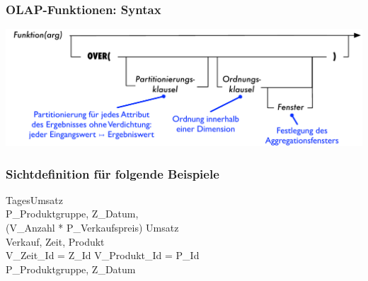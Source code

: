     
    
    \begin{frame}
    
    \frametitle{OLAP-Funktionen: Syntax}
    
    
    
    \begin{center}
      \includegraphics[scale=.6]{fig3/OLAP-Syntax.pdf}
    \end{center}
    
    
    \end{frame}
    
    
    
    \begin{frame}
    \frametitle{Sichtdefinition für folgende Beispiele}
    
    \begin{sql}
     TagesUmsatz  \\
    \1  P\_Produktgruppe, Z\_Datum, \\
    \2 (V\_Anzahl * P\_Verkaufspreis)  Umsatz \\
    \1  Verkauf, Zeit, Produkt \\
    \1  V\_Zeit\_Id = Z\_Id  V\_Produkt\_Id = P\_Id \\
    \1  P\_Produktgruppe, Z\_Datum
    \end{sql}
    
    \end{frame}
    
    
